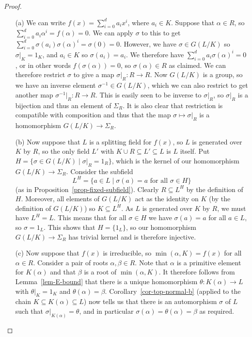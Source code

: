 \documentclass{amsart}
\newcommand{\al}        {\alpha}
\newcommand{\bt}        {\beta}
\newcommand{\tht}       {\theta}
\newcommand{\sg}        {\sigma}
\newcommand{\Sg}        {\Sigma}
\newcommand{\st}        {\;|\;}
\newcommand{\sse}       {\subseteq}
\renewcommand{\:}{\colon}
\theoremstyle{definition}
\begin{document}
\begin{proof}
 \begin{itemize}
  \item[(a)] We can write $f(x)=\sum_{i=0}^da_ix^i$, where
   $a_i\in K$.  Suppose that $\al\in R$, so
   $\sum_{i=0}^da_i\al^i=f(\al)=0$.  We can apply $\sg$ to this to get 
   $\sum_{i=0}^d\sg(a_i)\sg(\al)^i=\sg(0)=0$.  However, we have
   $\sg\in G(L/K)$ so $\sg|_K=1_K$, and $a_i\in K$ so $\sg(a_i)=a_i$.
   We therefore have $\sum_{i=0}^da_i\sg(\al)^i=0$, or in other words
   $f(\sg(\al))=0$, so $\sg(\al)\in R$ as claimed.  We can therefore
   restrict $\sg$ to give a map $\sg|_R\:R\to R$.  Now $G(L/K)$ is a
   group, so we have an inverse element $\sg^{-1}\in G(L/K)$, which we
   can also restrict to get another map $\sg^{-1}|_R\:R\to R$.  This
   is easily seen to be inverse to $\sg|_R$, so $\sg|_R$ is a
   bijection and thus an element of $\Sg_R$.  It is also clear that
   restriction is compatible with composition and thus that the map
   $\sg\mapsto\sg|_R$ is a homomorphism $G(L/K)\to\Sg_R$.
  \item[(b)] Now suppose that $L$ is a splitting field for $f(x)$, so
   $L$ is generated over $K$ by $R$, so the only field $L'$ with
   $K\cup R\sse L'\sse L$ is $L$ itself.  Put
   $H=\{\sg\in G(L/K)\st \sg|_R=1_R\}$, which is the kernel of our
   homomorphism $G(L/K)\to\Sg_R$.  Consider the subfield
   \[ L^H=\{a\in L\st \sg(a)=a \text{ for all } \sg\in H\} \]
   (as in Proposition~\ref{prop-fixed-subfield}).  Clearly $R\sse L^H$
   by the definition of $H$.  Moreover, all elements of $G(L/K)$ act
   as the identity on $K$ (by the definition of $G(L/K)$) so
   $K\sse L^H$.  As $L$ is generated over $K$ by $R$, we must have
   $L^H=L$.  This means that for all $\sg\in H$ we have
   $\sg(a)=a$ for all $a\in L$, so $\sg=1_L$.  This shows that
   $H=\{1_L\}$, so our homomorphism $G(L/K)\to\Sg_R$ has trivial
   kernel and is therefore injective.
  \item[(c)] Now suppose that $f(x)$ is irreducible, so
   $\min(\al,K)=f(x)$ for all $\al\in R$.  Consider a pair of roots
   $\al,\bt\in R$.  Note that $\al$ is a primitive element for
   $K(\al)$ and that $\bt$ is a root of $\min(\al,K)$.  It therefore
   follows from Lemma~\ref{lem-E-bound} that there is a unique
   homomorphism $\tht\:K(\al)\to L$ with $\tht|_K=1_K$ and
   $\tht(\al)=\bt$.  Corollary~\ref{cor-top-normal-b} (applied to the
   chain $K\sse K(\al)\sse L$) now tells us that there is an
   automorphism $\sg$ of $L$ such that $\sg|_{K(\al)}=\tht$, and in
   particular $\sg(\al)=\tht(\al)=\bt$ as required.
 \end{itemize}
\end{proof}
\end{document}
